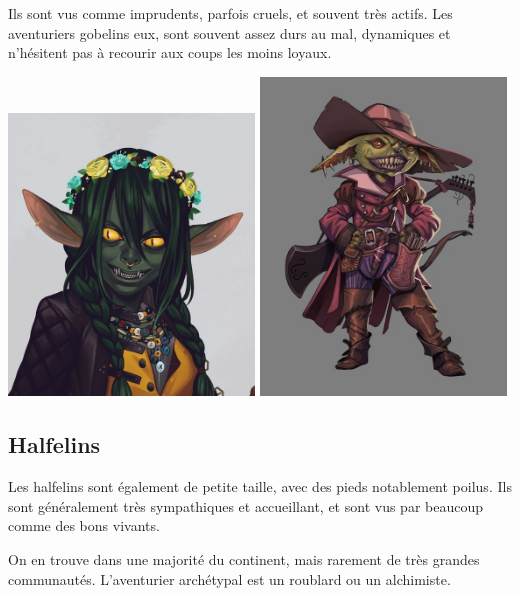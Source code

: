\documentclass[10pt,a4paper]{book}
\begin{document}
Ils sont vus comme imprudents, parfois cruels, et souvent très actifs. Les aventuriers gobelins eux, sont souvent assez durs au mal, dynamiques et n'hésitent pas à recourir aux coups les moins loyaux.

\includegraphics[width=0.49\textwidth]{gobelin 2}
\includegraphics[width=0.49\textwidth]{gobelin 3}
\subsection{Halfelins}
Les halfelins sont également de petite taille, avec des pieds notablement poilus. Ils sont généralement très sympathiques et accueillant, et sont vus par beaucoup comme des bons vivants.

On en trouve dans une majorité du continent, mais rarement de très grandes communautés. L'aventurier archétypal est un roublard ou un alchimiste.
\end{document}
